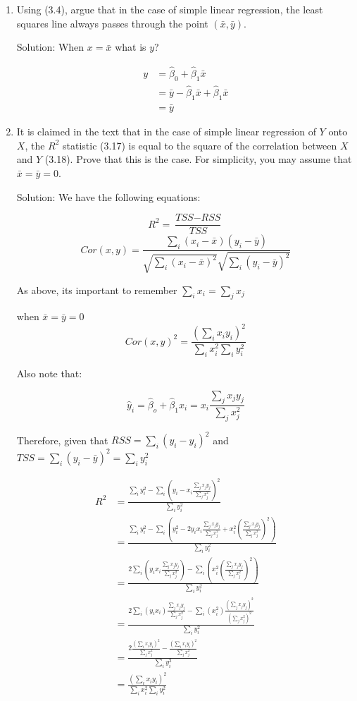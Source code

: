 \documentclass{article}
\begin{document}
\begin{enumerate}
$$a_{i'} = \frac{ x_i x_{i'}}{\sum x^2}$$

\item Using (3.4), argue that in the case of simple linear regression, the
 least squares line always passes through the point $(\bar{x}, \bar{y})$.

Solution: When $x = \bar{x}$ what is $y$?

\begin{align}
y &= \hat\beta_0 + \hat\beta_1\bar{x} \\
  &= \bar{y} - \hat\beta_1\bar{x} + \hat\beta_1\bar{x} \\
  &= \bar{y}
\end{align}

\item It is claimed in the text that in the case of simple linear regression
 of $Y$ onto $X$, the $R^2$ statistic (3.17) is equal to the square of the
 correlation between $X$ and $Y$ (3.18). Prove that this is the case. For
 simplicity, you may assume that $\bar{x} = \bar{y} = 0$.

Solution: We have the following equations:

$$ R^2 = \frac{\textit{TSS} - \textit{RSS}}{\textit{TSS}} $$
$$ Cor(x,y) = \frac{\sum_i (x_i-\bar{x})(y_i - \bar{y})}{\sqrt{\sum_i(x_i - \bar{x})^2}\sqrt{\sum_i(y_i - \bar{y})^2}} $$

As above, its important to remember $\sum_i x_i = \sum_j x_j$

when $\bar{x} = \bar{y} = 0$
$$ Cor(x,y)^2 = \frac{(\sum_ix_iy_i)^2}{\sum_ix_i^2 \sum_iy_i^2} $$

Also note that:

$$\hat{y}_i = \hat\beta_o + \hat\beta_1x_i = x_i\frac{\sum_j{x_jy_j}}{\sum_jx_j^2}$$

Therefore, given that $RSS = \sum_i(y_i - \hat{y}_i)^2$ and
$\textit{TSS} = \sum_i(y_i - \bar{y})^2 = \sum_iy_i^2$

\begin{align}
R^2 &= \frac{\sum_iy_i^2 - \sum_i(y_i - x_i\frac{\sum_j{x_jy_j}}{\sum_jx_j^2})^2}
            {\sum_iy_i^2} \\
    &= \frac{\sum_iy_i^2 - \sum_i(
          y_i^2 -
          2y_ix_i\frac{\sum_j{x_jy_j}}{\sum_jx_j^2} +
          x_i^2 (\frac{\sum_j{x_jy_j}}{\sum_jx_j^2})^2
        )}{\sum_iy_i^2} \\
    &= \frac{
          2\sum_i(y_ix_i\frac{\sum_j{x_jy_j}}{\sum_jx_j^2}) -
          \sum_i(x_i^2 (\frac{\sum_j{x_jy_j}}{\sum_jx_j^2})^2)
        }{\sum_iy_i^2} \\
    &= \frac{
          2\sum_i(y_ix_i) \frac{\sum_j{x_jy_j}}{\sum_jx_j^2} -
          \sum_i(x_i^2) \frac{(\sum_j{x_jy_j})^2}{(\sum_jx_j^2)^2}
        }{\sum_iy_i^2} \\
    &= \frac{
          2\frac{(\sum_i{x_iy_i})^2}{\sum_jx_j^2} -
          \frac{(\sum_i{x_iy_i})^2}{\sum_jx_j^2}
        }{\sum_iy_i^2} \\
    &= \frac{(\sum_i{x_iy_i})^2}{\sum_ix_i^2 \sum_iy_i^2}
\end{align}
\end{enumerate}
\end{document}
